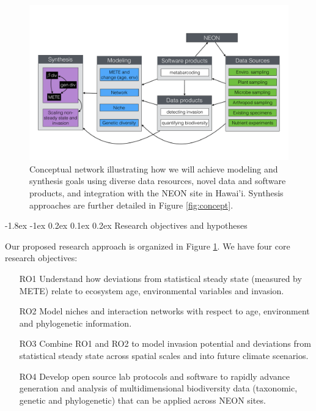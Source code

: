\documentclass[11pt]{article}
\makeatletter
\renewcommand\subsection{\@startsection{subsection}{1}{\z@}%
                                  {-1.8ex \@plus -1ex \@minus 0.2ex}%
                                  {0.1ex \@plus 0.2ex}%
                                  {\normalfont\large\bfseries}}
\makeatother
\begin{document}
\begin{figure}[!htb]
  \centering
  \includegraphics[scale=0.4]{../figs/fig_research.pdf}
  \caption{Conceptual network illustrating how we will achieve
    modeling and synthesis goals using diverse data resources, novel
    data and software products, and integration with the NEON site in
    Hawai'i. Synthesis approaches are further detailed in Figure
    \ref{fig:concept}.}
  \label{fig:research}
\end{figure}

\subsection{Research objectives and hypotheses}

Our proposed research approach is organized in Figure
\ref{fig:research}.  We have four core research objectives:
\begin{itemize}
\item[RO1] Understand how deviations from statistical steady state
  (measured by METE) relate to ecosystem age, environmental
  variables and invasion.
\item[RO2] Model niches and interaction networks with respect to
  age, environment and phylogenetic information.
\item[RO3] Combine RO1 and RO2 to model invasion potential and
  deviations from statistical steady state across spatial scales
  and into future climate scenarios.
\item[RO4] Develop open source lab protocols and software to rapidly
  advance generation and analysis of multidimensional biodiversity
  data (taxonomic, genetic and phylogenetic) that can be applied
  across NEON sites.
\end{itemize}
\end{document}
